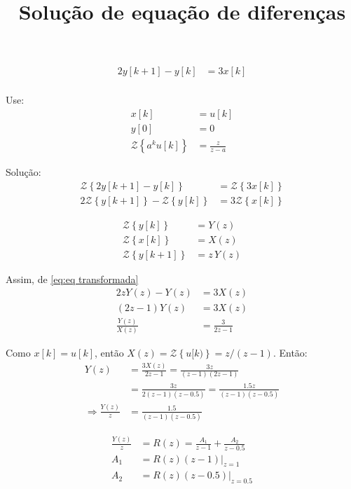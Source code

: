 \documentclass[12pt, a4paper]{article}
\title{Solução de equação de diferenças}
\date{}
\begin{document}
	\maketitle

\section{ }

\newcommand{\Z}[1]{\mathcal{Z}\left\{#1\right\}}
\newcommand{\iZ}[1]{\mathcal{Z}^{-1}\left\{#1\right\}}
\begin{align}
	2y[k+1]-y[k]&=3x[k]\\
\end{align}

Use:
\begin{align}
	x[k] &= u[k]\\
	y[0] &= 0\\
	\Z{a^ku[k]} &= \frac{z}{z-a}
\end{align}


Solução:
\begin{align}
	\Z{2y[k+1]-y[k]}&=\Z{3x[k]}\\
	2\Z{y[k+1]}-\Z{y[k]}&=3\Z{x[k]}\label{eq:eq transformada}
\end{align}

\begin{align}
	\Z{y[k]} &= Y(z)\\
	\Z{x[k]} &= X(z)\\
	\Z{y[k+1]} &= z\,Y(z)
\end{align}

Assim, de \eqref{eq:eq transformada}
\begin{align}
	2zY(z)-Y(z)&=3X(z)\\
	(2z-1)Y(z) &= 3X(z)\\
	\frac{Y(z)}{X(z)} &= \frac{3}{2z-1}
\end{align}

\pagebreak

Como $x[k]=u[k]$, então $X(z)=\Z{u[k)}=z/(z-1)$. Então:
\begin{align}
Y(z) &= \frac{3X(z)}{2z-1} = \frac{3z}{(z-1)(2z-1)}\\
&= \frac{3z}{2(z-1)(z-0.5)}= \frac{1.5z}{(z-1)(z-0.5)}\\
\Rightarrow \frac{Y(z)}{z} &= \frac{1.5}{(z-1)(z-0.5)}
\end{align}

\begin{align}
	\frac{Y(z)}{z} &= R(z)= \frac{A_1}{z-1}+\frac{A_2}{z-0.5}\\
	A_1 &= \left.R(z)(z-1)\right|_{z=1}\\
	A_2 &= \left.R(z)(z-0.5)\right|_{z=0.5}
\end{align}
\end{document}
